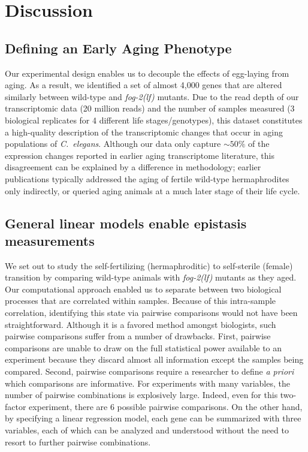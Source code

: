 \documentclass[9pt,twocolumn,twoside]{gsag3jnl}
\newcommand{\cel}{\emph{C.~elegans}}
\newcommand{\fog}{\emph{\mbox{fog-2(lf)}}}
\begin{document}
\section{Discussion}
\label{sec:discussion}

\subsection*{Defining an Early Aging Phenotype}
\label{sub:Defining an Early Aging Phenotype}

Our experimental design enables us to decouple the effects of egg-laying from
aging. As a result, we identified a set of almost 4,000 genes that are altered
similarly between wild-type and \fog{} mutants. Due to the read depth of our
transcriptomic data (20 million reads) and the number of samples measured (3
biological replicates for 4 different life stages/genotypes), this dataset
constitutes a high-quality description of the transcriptomic changes that occur
in aging populations of \cel{}.
Although our data only capture $\sim50\%$ of the expression changes reported
in earlier aging transcriptome literature, this disagreement can be explained
by a difference in methodology; earlier publications typically addressed the
aging of fertile wild-type hermaphrodites only indirectly, or queried aging
animals at a much later stage of their life cycle.


\subsection*{General linear models enable epistasis measurements}
\label{sub:lin_models}

We set out to study the self-fertilizing (hermaphroditic) to self-sterile
(female) transition by comparing wild-type animals with \fog{} mutants as they
aged. Our computational approach enabled us to separate between two biological
processes that are correlated within samples. Because of this intra-sample
correlation, identifying this state via pairwise comparisons would not have been
straightforward. Although it is a favored method amongst biologists, such
pairwise comparisons suffer from a number of drawbacks.
First, pairwise comparisons are unable to draw on the full statistical power
available to an experiment because they discard almost all information except
the samples being compared. Second, pairwise comparisons require a researcher
to define \emph{a priori} which comparisons are informative. For experiments
with many variables, the number of pairwise combinations is explosively large.
Indeed, even for this two-factor experiment, there are 6 possible pairwise
comparisons. On the other hand, by specifying a linear regression model, each
gene can be summarized with three variables, each of which can be analyzed and
understood without the need to resort to further pairwise combinations.
\end{document}

